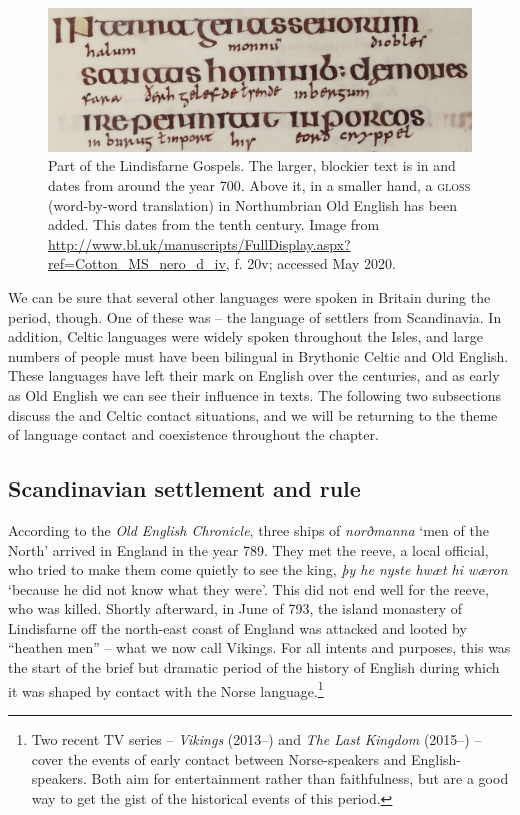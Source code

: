 \begin{figure}
    \centering
    \includegraphics[scale=0.3]{chapters/img/lindisfarne.png}
    \caption{Part of the Lindisfarne Gospels. The larger, blockier text is in  and dates from around the year 700. Above it, in a smaller hand, a \textsc{gloss} (word-by-word translation) in Northumbrian Old English has been added. This dates from the tenth century. Image from \url{http://www.bl.uk/manuscripts/FullDisplay.aspx?ref=Cotton_MS_nero_d_iv}, f. 20v; accessed May 2020.}
    \label{fig:lindisfarne}
\end{figure}

We can be sure that several other languages were spoken in Britain during the period, though. One of these was  -- the language of settlers from Scandinavia. In addition, Celtic languages were widely spoken throughout the Isles, and large numbers of people must have been bilingual in Brythonic Celtic and Old English. These languages have left their mark on English over the centuries, and as early as Old English we can see their influence in texts. The following two subsections discuss the  and Celtic contact situations, and we will be returning to the theme of language contact and coexistence throughout the chapter.

\subsection{Scandinavian settlement and rule}\label{OE-Scandinavian}

According to the \textit{Old English Chronicle}, three ships of \emph{norðmanna} `men of the North' arrived in England in the year 789. They met the reeve, a local official, who tried to make them come quietly to see the king, \emph{þy he nyste hwæt hi wæron} `because he did not know what they were'. This did not end well for the reeve, who was killed. Shortly afterward, in June of 793, the island monastery of Lindisfarne off the north-east coast of England was attacked and looted by ``heathen men'' -- what we now call Vikings. For all intents and purposes, this was the start of the brief but dramatic period of the history of English during which it was shaped by contact with the Norse language.\footnote{Two recent TV series -- \textit{Vikings} (2013--) and \textit{The Last Kingdom} (2015--) -- cover the events of early contact between Norse-speakers and English-speakers. Both aim for entertainment rather than faithfulness, but are a good way to get the gist of the historical events of this period.}

